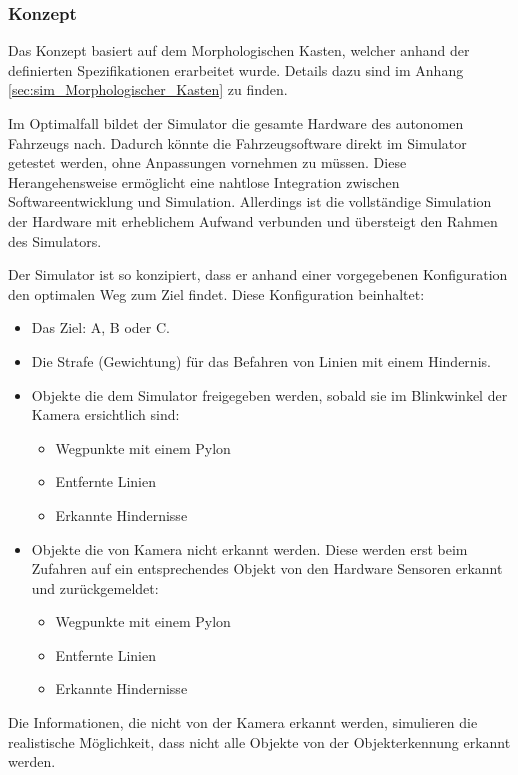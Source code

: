 \documentclass[../main.tex]{subfiles}
\begin{document}
\subsubsection{Konzept}

Das Konzept basiert auf dem Morphologischen Kasten, welcher anhand der definierten Spezifikationen erarbeitet wurde. Details dazu sind im Anhang \ref{sec:sim_Morphologischer_Kasten} zu finden.

Im Optimalfall bildet der Simulator die gesamte Hardware des autonomen Fahrzeugs nach. Dadurch könnte die Fahrzeugsoftware direkt im Simulator getestet werden, ohne Anpassungen vornehmen zu müssen. Diese Herangehensweise ermöglicht eine nahtlose Integration zwischen Softwareentwicklung und Simulation. Allerdings ist die vollständige Simulation der Hardware mit erheblichem Aufwand verbunden und übersteigt den Rahmen des Simulators.

Der Simulator ist so konzipiert, dass er anhand einer vorgegebenen Konfiguration den optimalen Weg zum Ziel findet. Diese Konfiguration beinhaltet:
\begin{itemize}
    \item Das Ziel: A, B oder C.
    \item Die Strafe (Gewichtung) für das Befahren von Linien mit einem Hindernis.
    \item Objekte die dem Simulator freigegeben werden, sobald sie im Blinkwinkel der Kamera ersichtlich sind:
     \begin{itemize}
        \item Wegpunkte mit einem Pylon 
        \item Entfernte Linien
        \item Erkannte Hindernisse
     \end{itemize}
   \item Objekte die von Kamera nicht erkannt werden. Diese werden erst beim Zufahren auf ein entsprechendes Objekt von den Hardware Sensoren erkannt und zurückgemeldet:
    \begin{itemize}
      \item Wegpunkte mit einem Pylon 
      \item Entfernte Linien
      \item Erkannte Hindernisse
    \end{itemize}
\end{itemize}

Die Informationen, die nicht von der Kamera erkannt werden, simulieren die realistische Möglichkeit, dass nicht alle Objekte von der Objekterkennung erkannt werden.  
\end{document}
